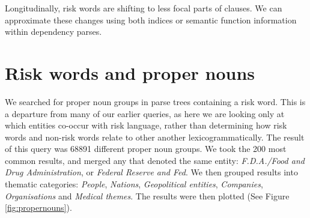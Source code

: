 

    \vspace{5mm}\noindent\begin{tcolorbox}[colback=yellow!5,colframe=yellow!40!black,title=Summary: risk and arguability]
    \parbox{1\textwidth}{%
    Longitudinally, risk words are shifting to less focal parts of clauses. We can approximate these changes using both indices or semantic function information within dependency parses.}
    \end{tcolorbox}
    \vspace{5mm}

\section{Risk words and proper nouns} \FloatBarrier

    We searched for proper noun groups in parse trees containing a risk word. This is a departure from many of our earlier queries, as here we are looking only at which entities co-occur with risk language, rather than determining how risk words and non-risk words relate to other another lexicogrammatically. The result of this query was 68891 different proper noun groups. We took the 200 most common results, and merged any that denoted the same entity: \emph{F.D.A.\slash Food and Drug Administration}, or \emph{Federal Reserve and Fed}. We then grouped results into thematic categories: \emph{People}, \emph{Nations}, \emph{Geopolitical entities}, \emph{Companies}, \emph{Organisations} and \emph{Medical themes}. The results were then plotted (See Figure \ref{fig:propernouns}). 

